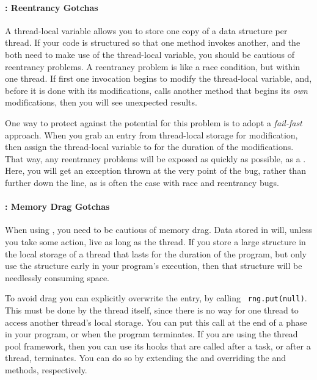 %   

\paragraph{\Tls: Reentrancy Gotchas}
A thread-local variable allows you to store one copy of a data structure per
thread. If your code is structured so that one method invokes another, and the
both need to make use of the thread-local variable, you should be cautious of
reentrancy problems. A reentrancy problem is like a race condition, but within
one thread. If first one invocation begins to modify the thread-local variable,
and, before it is done with its modifications, calls another method that begins
its \emph{own} modifications, then you will see unexpected results.

One way to protect against the potential for this problem is to adopt a
\emph{fail-fast} approach. When you grab an entry from thread-local storage for
modification, then assign the thread-local variable to  for the
duration of the modifications. That way, any reentrancy problems will be exposed
as quickly as possible, as a . Here, you will get an
exception thrown at the very point of the bug, rather than further down the
line, as is often the case with race and reentrancy bugs.

\paragraph{\Tls: Memory Drag Gotchas}

When using \tls, you need to be cautious of memory drag. Data stored in \tls
will, unless you take some action, live as long as the thread. If you store a
large structure in the local storage of a thread that lasts for the duration of
the program, but only use the structure early in your program's execution, then
that structure will be needlessly consuming space. 

To avoid drag you can explicitly overwrite the entry, by calling {\tt
rng.put(null)}. This must be done by the thread itself, since there is no way
for one thread to access another thread's local storage. You can put this call
at the end of a phase in your program, or when the program terminates. If you
are using the  thread pool framework, then you can
use its hooks that are called after a task, or after a thread, terminates. You
can do so by extending the  and overriding the
 and  methods, respectively.

